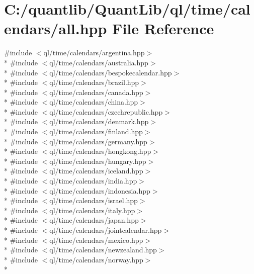 \section{C\+:/quantlib/\+Quant\+Lib/ql/time/calendars/all.hpp File Reference}
\label{all_8hpp}
{\ttfamily \#include $<$ql/time/calendars/argentina.\+hpp$>$}\\*
{\ttfamily \#include $<$ql/time/calendars/australia.\+hpp$>$}\\*
{\ttfamily \#include $<$ql/time/calendars/bespokecalendar.\+hpp$>$}\\*
{\ttfamily \#include $<$ql/time/calendars/brazil.\+hpp$>$}\\*
{\ttfamily \#include $<$ql/time/calendars/canada.\+hpp$>$}\\*
{\ttfamily \#include $<$ql/time/calendars/china.\+hpp$>$}\\*
{\ttfamily \#include $<$ql/time/calendars/czechrepublic.\+hpp$>$}\\*
{\ttfamily \#include $<$ql/time/calendars/denmark.\+hpp$>$}\\*
{\ttfamily \#include $<$ql/time/calendars/finland.\+hpp$>$}\\*
{\ttfamily \#include $<$ql/time/calendars/germany.\+hpp$>$}\\*
{\ttfamily \#include $<$ql/time/calendars/hongkong.\+hpp$>$}\\*
{\ttfamily \#include $<$ql/time/calendars/hungary.\+hpp$>$}\\*
{\ttfamily \#include $<$ql/time/calendars/iceland.\+hpp$>$}\\*
{\ttfamily \#include $<$ql/time/calendars/india.\+hpp$>$}\\*
{\ttfamily \#include $<$ql/time/calendars/indonesia.\+hpp$>$}\\*
{\ttfamily \#include $<$ql/time/calendars/israel.\+hpp$>$}\\*
{\ttfamily \#include $<$ql/time/calendars/italy.\+hpp$>$}\\*
{\ttfamily \#include $<$ql/time/calendars/japan.\+hpp$>$}\\*
{\ttfamily \#include $<$ql/time/calendars/jointcalendar.\+hpp$>$}\\*
{\ttfamily \#include $<$ql/time/calendars/mexico.\+hpp$>$}\\*
{\ttfamily \#include $<$ql/time/calendars/newzealand.\+hpp$>$}\\*
{\ttfamily \#include $<$ql/time/calendars/norway.\+hpp$>$}\\*
